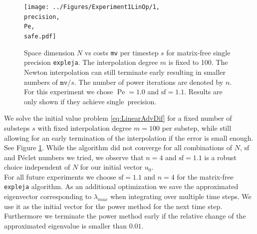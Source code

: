 \documentclass{scrartcl}
\begin{document}
	\begin{figure}[h]
		\newcommand{\Pe}{Pe=1.0}
		\newcommand{\precision}{single}
		\newcommand{\safe}{sf=1.1}
		
		\centering
		\texttt{[image: ../Figures/Experiment1LinOp/1, \\precision, \\Pe, \\safe.pdf]}
		\caption{Space dimension $N$ vs costs \texttt{mv} per timestep $s$ for matrix-free single precision \texttt{expleja}. The interpolation degree $m$ is fixed to 100. The Newton interpolation can still terminate early resulting in smaller numbers of $\texttt{mv}/s$. The number of power iterations are denoted by $n$. For this experiment we chose $\operatorname{Pe}=1.0$ and $\text{sf}=1.1$. Results are only shown if they achieve \precision\ precision.} \label{fig:Poweriterations}
	\end{figure}
	We solve the initial value problem \ref{eq:LinearAdvDif} for a fixed number of substeps $s$ with fixed interpolation degree $m=100$ per substep, while still allowing for an early termination of the interpolation if the error is small enough. See Figure \ref{fig:Poweriterations}. While the algorithm did not converge for all combinations of $N$, $\text{sf}$ and P\'eclet numbers we tried, we observe that $n=4$ and $\text{sf}=1.1$ is a robust choice independent of $N$ for our initial vector $u_0$.\\
	For all future experiments we choose $\text{sf}=1.1$ and $n=4$ for the matrix-free \texttt{expleja} algorithm. As an additional optimization we save the approximated eigenvector corresponding to $\lambda_{max}$ when integrating over multiple time steps. We use it as the initial vector for the power method for the next time step. Furthermore we terminate the power method early if the relative change of the approximated eigenvalue is smaller than $0.01$. 
\end{document}
